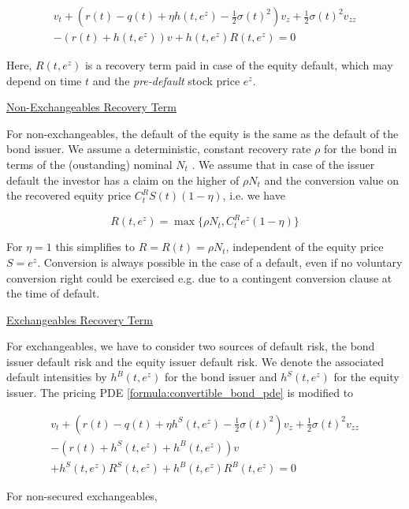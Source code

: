 \begin{eqnarray}\label{formula:convertible_bond_pde}
v_t + \left( r(t)-q(t)+\eta h(t,e^z)-\frac{1}{2}\sigma(t)^2 \right) v_z + \frac{1}{2}\sigma(t)^2 v_{zz}  \\
- (r(t)+h(t,e^z)) v + h(t,e^z) R(t,e^z) = 0
\end{eqnarray}

Here, $R(t,e^z)$ is a recovery term paid in case of the equity default, which may depend on time $t$ and the {\em
  pre-default} stock price $e^z$.

\underline{Non-Exchangeables Recovery Term}

For non-exchangeables, the default of the equity is the same as the default of the bond issuer. We assume a
deterministic, constant recovery rate $\rho$ for the bond in terms of the (oustanding) nominal $N_t$ . We assume that in
case of the issuer default the investor has a claim on the higher of $\rho N_t$ and the conversion value on the
recovered equity price $C^R_t S(t) (1-\eta)$, i.e. we have

\begin{equation}
R(t,e^z) = \max \{ \rho N_t, C^R_t e^z (1-\eta) \}
\end{equation}

For $\eta = 1$ this simplifies to $R = R(t) = \rho N_t$, independent of the equity price $S = e^z$. Conversion is always
possible in the case of a default, even if no voluntary conversion right could be exercised e.g. due to a contingent
conversion clause at the time of default.

\underline{Exchangeables Recovery Term}

For exchangeables, we have to consider two sources of default risk, the bond issuer default risk and the equity issuer
default risk. We denote the associated default intensities by $h^B(t,e^z)$ for the bond issuer and $h^S(t,e^z)$ for the
equity issuer. The pricing PDE \ref{formula:convertible_bond_pde} is modified to

\begin{eqnarray}\label{formula:convertible_bond_pde_exchangeables}
  v_t + \left( r(t)-q(t)+\eta h^S(t,e^z)-\frac{1}{2}\sigma(t)^2 \right) v_z + \frac{1}{2}\sigma(t)^2 v_{zz} \\
  - (r(t)+h^S(t,e^z) + h^B(t,e^z)) v \\
+ h^S(t,e^z) R^S(t,e^z) + h^B(t,e^z)R^B(t,e^z) = 0
\end{eqnarray}

For non-secured exchangeables,

